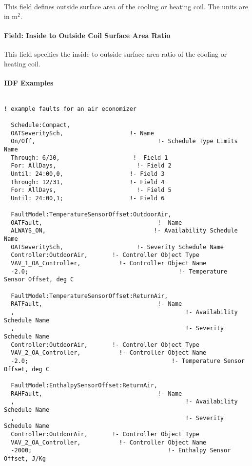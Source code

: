 This field defines outside surface area of the cooling or heating coil. The units are in m\(^{2}\).

\paragraph{Field: Inside to Outside Coil Surface Area Ratio}\label{field-inside-to-outside-coil-surface-area-ratio}

This field specifies the inside to outside surface area ratio of the cooling or heating coil.

\paragraph{IDF Examples}

\begin{lstlisting}

! example faults for an air economizer

  Schedule:Compact,
  OATSeveritySch,                   !- Name
  On/Off,                                   !- Schedule Type Limits Name
  Through: 6/30,                     !- Field 1
  For: AllDays,                       !- Field 2
  Until: 24:00,0,                   !- Field 3
  Through: 12/31,                   !- Field 4
  For: AllDays,                       !- Field 5
  Until: 24:00,1;                   !- Field 6

  FaultModel:TemperatureSensorOffset:OutdoorAir,
  OATFault,                                 !- Name
  ALWAYS_ON,                               !- Availability Schedule Name
  OATSeveritySch,                     !- Severity Schedule Name
  Controller:OutdoorAir,       !- Controller Object Type
  VAV_1_OA_Controller,           !- Controller Object Name
  -2.0;                                           !- Temperature Sensor Offset, deg C

  FaultModel:TemperatureSensorOffset:ReturnAir,
  RATFault,                                 !- Name
  ,                                                 !- Availability Schedule Name
  ,                                                 !- Severity Schedule Name
  Controller:OutdoorAir,       !- Controller Object Type
  VAV_2_OA_Controller,           !- Controller Object Name
  -2.0;                                         !- Temperature Sensor Offset, deg C

  FaultModel:EnthalpySensorOffset:ReturnAir,
  RAHFault,                                 !- Name
  ,                                                 !- Availability Schedule Name
  ,                                                 !- Severity Schedule Name
  Controller:OutdoorAir,       !- Controller Object Type
  VAV_2_OA_Controller,           !- Controller Object Name
  -2000;                                       !- Enthalpy Sensor Offset, J/Kg


\end{lstlisting}
